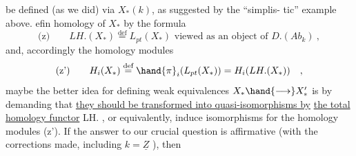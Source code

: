 be defined (as we did) via $X_{*}(k)$, as suggested by the  ``simplis-%
tic'' example above.  efin homology of $X_{*}$ by the formula
\[ \text{(z)} \qquad LH.(X_{*}) \overset{\text{def}}{=} L_{pt}(X_{*}) \text{ viewed as an object of } D.(Ab_{k}) \ , \]
and, accordingly the homology modules
\[ \text{(z')} \qquad H_{i}(X_{*}) \overset{\text{def}}{=} \hand{\pi}_{i}(L_{pt}(X_{*})) = H_{i}(LH.(X_{*})) \quad , \]
maybe the better idea for defining weak equivalences $X_{*} \hand{\longrightarrow} X'_{*}$ is
by demanding that \uline{they should be transformed into quasi-isomorphisms by}
\uline{the total homology functor} LH. , or equivalently, induce isomorphisms
for the homology modules (z'). If the answer to our crucial question
is affirmative (with the corrections made, including $k = \underline{Z}$ ), then

